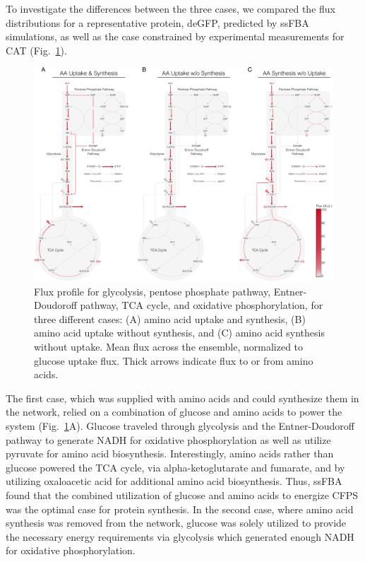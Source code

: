 \documentclass[journal=asbcd6,manuscript=article]{achemso}
\begin{document}
To investigate the differences between the three cases, we compared the flux distributions for a representative protein, deGFP, predicted by ssFBA simulations, as well as the case constrained by experimental measurements for CAT (Fig.~\ref{fig:flux}).
\begin{figure}[t!]
\includegraphics[width=1.00\textwidth]{./Figures/Flux.pdf}
\caption{Flux profile for glycolysis, pentose phosphate pathway, Entner-Doudoroff pathway, TCA cycle, and oxidative phosphorylation, for three different cases: (A) amino acid uptake and synthesis, (B) amino acid uptake without synthesis, and (C) amino acid synthesis without uptake. Mean flux across the ensemble, normalized to glucose uptake flux. Thick arrows indicate flux to or from amino acids.}
\label{fig:flux}
\end{figure}
The first case, which was supplied with amino acids and could synthesize them in the network, relied on a combination of glucose and amino acids to power the system (Fig.~\ref{fig:flux}A).
Glucose traveled through glycolysis and the Entner-Doudoroff pathway to generate NADH for oxidative phosphorylation as well as utilize pyruvate for amino acid biosynthesis.
Interestingly, amino acids rather than glucose powered the TCA cycle, via alpha-ketoglutarate and fumarate, and by utilizing oxaloacetic acid for additional amino acid biosynthesis.
Thus, ssFBA found that the combined utilization of glucose and amino acids to energize CFPS was the optimal case for protein synthesis.
In the second case, where amino acid synthesis was removed from the network, glucose was solely utilized to provide the necessary energy requirements via glycolysis which generated enough NADH for oxidative phosphorylation.
\end{document}
